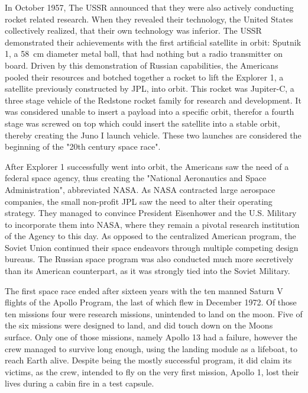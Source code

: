 In October 1957, The USSR announced that they were also actively conducting rocket related research. When they revealed their technology, the United States collectively realized, that their own technology was inferior. The USSR demonstrated their achievements with the first artificial satellite in orbit: Sputnik 1, a \SI{58}{\centi\meter} diameter metal ball, that had nothing but a radio transmitter on board. Driven by this demonstration of Russian capabilities, the Americans pooled their resources and botched together a rocket to lift the Explorer 1, a satellite previously constructed by JPL, into orbit. This rocket was Jupiter-C, a three stage vehicle of the Redstone rocket family for research and development. It was considered unable to insert a payload into a specific orbit, therefor a fourth stage was screwed on top which could insert the satellite into a stable orbit, thereby creating the Juno I launch vehicle. These two launches are considered the beginning of the "20th century space race".\cite{jpl-history-firstsat}\cite{nasa-beginning}

After Explorer 1 successfully went into orbit, the Americans saw the need of a federal space agency, thus creating the "National Aeronautics and Space Administration", abbreviated NASA. As NASA contracted large aerospace companies, the small non-profit JPL saw the need to alter their operating strategy. They managed to convince President Eisenhower and the U.S. Military to incorporate them into NASA, where they remain a pivotal research institution of the Agency to this day. \cite{jpl-history-joinnasa} As opposed to the centralized American program, the Soviet Union continued their space endeavors through multiple competing design bureaus. The Russian space program was also conducted much more secretively than its American counterpart, as it was strongly tied into the Soviet Military.\cite{ussr-space-program}

The first space race ended after sixteen years with the ten manned Saturn V flights of the Apollo Program, the last of which flew in December 1972. Of those ten missions four were research missions, unintended to land on the moon. Five of the six missions were designed to land, and did touch down on the Moons surface. Only one of those missions, namely Apollo 13 had a failure, however the crew managed to survive long enough, using the landing module as a lifeboat, to reach Earth alive. Despite being the mostly successful program, it did claim its victims, as the crew, intended to fly on the very first mission, Apollo 1, lost their lives during a cabin fire in a test capsule.\cite{apollo-mission}

